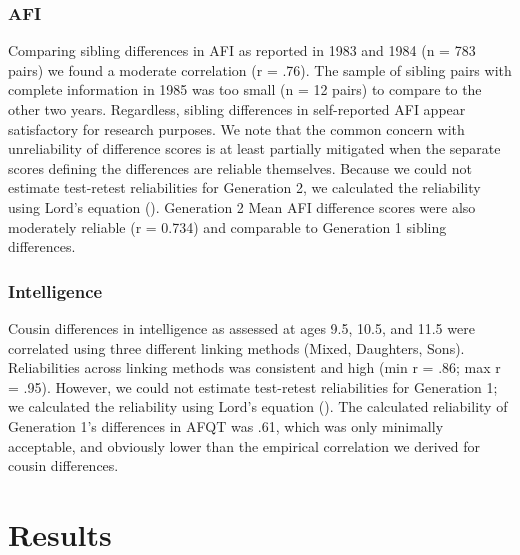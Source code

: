 \documentclass[a4paper,man,apacite,natbib,12pt,longtable,mask]{apa6}\usepackage[]{graphicx}\usepackage[]{color}
\begin{document}
\subsubsection{AFI} Comparing sibling differences in AFI as reported in 1983 and 1984 (n = 783 pairs) we found a moderate correlation (r = .76). The sample of sibling pairs with complete information in 1985 was too small (n = 12 pairs) to compare to the other two years. Regardless, sibling differences in self-reported AFI appear satisfactory for research purposes. We note that the common concern with unreliability of difference scores is at least partially mitigated when the separate scores defining the differences are reliable themselves. Because we could not estimate test-retest reliabilities for Generation 2, we calculated the reliability using Lord's equation (\citeyear{Lord1963}). Generation 2 Mean AFI difference scores were also moderately reliable (r = 0.734) and comparable to Generation 1 sibling differences.

\subsubsection{Intelligence} Cousin differences in intelligence as assessed at ages 9.5, 10.5, and 11.5 were correlated using three different linking methods (Mixed, Daughters, Sons). Reliabilities across linking methods was consistent and high (min r = .86; max r = .95). However, we could not estimate test-retest reliabilities for Generation 1; we calculated the reliability using Lord's equation (\citeyear{Lord1963}). The calculated reliability of Generation 1's differences in AFQT was .61, which was only minimally  acceptable, and obviously lower than the empirical correlation we derived for cousin differences.%

\section{Results}

%
\end{document}
